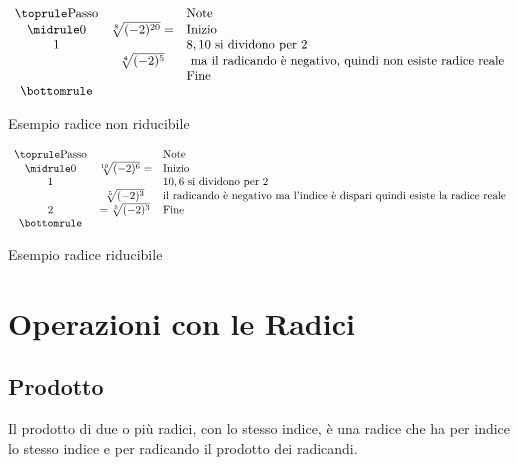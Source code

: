 \begin{table}[H]
\centering
$
\begin{array}{ccl}
\toprule
\text{Passo} &  & \text{Note} \\ 
\midrule
0 &\sqrt[8]{(-2)^{20}}= & \text{Inizio} \\ 
1 &  &  8,10 \text{ si dividono per }2\\
& \sqrt[4]{(-2)^{5}}&\text{ ma il radicando è negativo, quindi non esiste radice reale} \\ 
 & & \text{Fine} \\ 
\bottomrule
\end{array} 
$
\label{Tab:radiceriducibilece4}
\caption{Esempio radice non riducibile}
\end{table}
\begin{table}[H]
\centering
$
\begin{array}{ccl}
\toprule
\text{Passo} &  & \text{Note} \\ 
\midrule
0 &\sqrt[10]{(-2)^{6}}= & \text{Inizio} \\ 
1 &  &  10,6 \text{ si dividono per }2\\
& \sqrt[5]{(-2)^{3}}&\text{il radicando è negativo ma l'indice è dispari quindi esiste la radice reale} \\ 
2 &=\sqrt[5]{(-2)^{3}} & \text{Fine} \\ 
\bottomrule
\end{array} 
$
\label{Tab:radiceriducibilece5}
\caption{Esempio radice riducibile}
\end{table}
\section{Operazioni con le Radici}
\label{sec:operazioniradici}
\subsection{Prodotto}
\label{sec:prodottoradici}
Il prodotto di due o più radici, con lo stesso indice, è una radice che ha per indice lo stesso indice e per radicando il prodotto dei radicandi.

